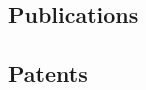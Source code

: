 \documentclass[]{mbcv}
\begin{document}
\begin{refsection}
\nocite{*}
\section{Publications}
\vspace*{10pt}
\printbibliography[heading=none]
\end{refsection}

\begin{refsection}
\nocite{*}
\section{Patents}
\vspace*{10pt}
\printbibliography[heading=none]
\end{refsection}

\end{document}

